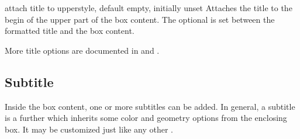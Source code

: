 \begin{docTcbKey}[][doc updated=2015-07-08]{attach title to upper}{}{style, default empty, initially unset}
Attaches the title to the begin of the upper part of the box content.
The optional  is set between the formatted title and the box content.
\end{docTcbKey}


\bigskip
\begin{marker}
More title options are documented in 
and .
\end{marker}



\clearpage
\subsection{Subtitle}

Inside the box content, one or more subtitles can be added.
In general, a subtitle is a further  which inherits some
color and geometry options from the enclosing box. It may be customized
just like any other .

